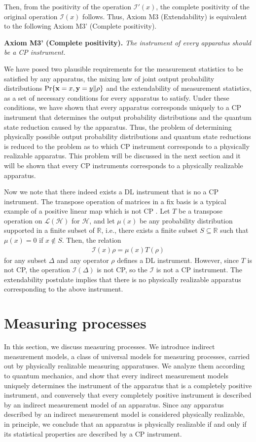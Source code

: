 \documentclass[12pt]{article}
\newcommand{\beqa}{\begin{eqnarray}}
\newcommand{\eeqa}{\end{eqnarray}}
\newcommand{\cH}{{\mathcal H}}
\newcommand{\cI}{{\mathcal I}}
\newcommand{\cL}{{\mathcal L}}
\newcommand{\rh}{\rho}
\newcommand{\De}{\Delta}
\newcommand{\bx}{{\bf x}}
\newcommand{\by}{{\bf y}}
\newcommand{\R}{\mathbb{R}}
\begin{document}
 Then, from the positivity of the operation
$\cI'(x)$, the complete positivity of the original operation $\cI(x)$
follows.  Thus, Axiom M3 (Extendability) is equivalent to the following 
Axiom M3' (Complete positivity).
\bigskip

{\bf Axiom M3' (Complete positivity).}
{\em The instrument of every apparatus should be a CP instrument.}
\bigskip

We have posed two plausible requirements for the measurement statistics 
to be satisfied by any apparatus,
the mixing law of joint output probability distributions $\Pr\{\bx=x,\by=y\| \rh\}$ 
and the extendability of measurement statistics, 
as a set of necessary conditions for every apparatus to satisfy. 
Under these conditions, we have shown that every
apparatus corresponds uniquely to a CP instrument
that determines the output probability distributions and
the quantum state reduction caused by the apparatus.
Thus, the problem of determining physically  possible output probability distributions
and quantum state reductions is reduced to the problem as to which
CP instrument corresponds to a physically realizable apparatus.
This problem will be discussed in the next section and it will be shown 
that every CP instruments corresponds to a physically realizable apparatus. 

Now we note that there indeed exists a DL instrument that is no a CP instrument. 
The transpose operation of matrices in a fix basis is 
a typical example of a positive linear map which is not CP \cite{NC00}.
Let $T$ be a transpose operation on $\cL(\cH)$ 
for $\cH$,
and let $\mu(x)$ be any probability distribution supported in a finite subset of $\R$,
i.e., there exists a finite subset $S\subseteq\R$ such that $\mu(x)=0$ if $x\not\in S$.
Then, the relation
\beqa
\cI(x)\rh=\mu(x)T(\rh)
\eeqa
for any subset $\De$ and any operator $\rh$
defines a DL instrument.  
However, since $T$ is not CP, the operation
$\cI(\De)$ is not CP, so the $\cI$ is not a CP instrument.
The extendability postulate implies that there is no physically realizable 
apparatus corresponding to the above instrument.


\section{Measuring processes}
In this section, we discuss measuring processes.
We introduce indirect measurement models, a class of universal models for 
measuring processes, carried out by physically realizable measuring apparatuses.
We analyze them according to quantum mechanics, and show that every 
indirect measurement models uniquely determines the instrument of the apparatus
that is a completely positive instrument, and conversely that every completely 
positive instrument is described by an indirect measurement model of an apparatus. 
Since any apparatus described by an indirect measurement model is considered
physically realizable, in principle, we conclude that an apparatus is physically realizable
if and only if its statistical properties are described by a CP instrument.
\end{document}
